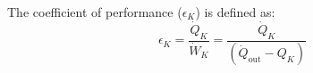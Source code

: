 The coefficient of performance (\( \epsilon_K \)) is defined as:  
\[
\epsilon_K = \frac{\dot{Q}_K}{\dot{W}_K} = \frac{\dot{Q}_K}{(\dot{Q}_{\text{out}} - Q_K)}
\]